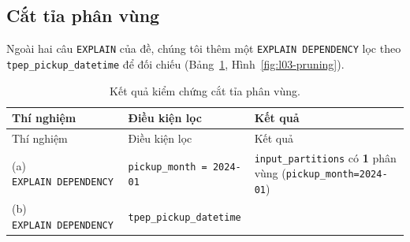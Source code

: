 \documentclass[
  12pt,
  a4paper,
]{report}
\begin{document}
\subsection{Cắt tỉa phân vùng}\label{sec:l03-res-pruning}

Ngoài hai câu \texttt{EXPLAIN} của đề, chúng tôi thêm một
\texttt{EXPLAIN\ DEPENDENCY}\allowbreak{} lọc theo
\texttt{tpep\_}\allowbreak{}\texttt{pickup\_}\allowbreak{}\texttt{datetime}\allowbreak{}
để đối chiếu (Bảng~\ref{tbl:l03-pruning}, Hình~\ref{fig:l03-pruning}).

\begin{longtable}[]{@{}
  >{\raggedright\arraybackslash}p{}
  >{\raggedright\arraybackslash}p{}
  >{\raggedright\arraybackslash}p{}@{}}
\caption{\label{tbl:l03-pruning}Kết quả kiểm chứng cắt tỉa phân
vùng.}\tabularnewline
\toprule\noalign{}
\begin{minipage}[b]{\linewidth}\raggedright
Thí nghiệm
\end{minipage} & \begin{minipage}[b]{\linewidth}\raggedright
Điều kiện lọc
\end{minipage} & \begin{minipage}[b]{\linewidth}\raggedright
Kết quả
\end{minipage} \\
\midrule\noalign{}
\endfirsthead
\toprule\noalign{}
\begin{minipage}[b]{\linewidth}\raggedright
Thí nghiệm
\end{minipage} & \begin{minipage}[b]{\linewidth}\raggedright
Điều kiện lọc
\end{minipage} & \begin{minipage}[b]{\linewidth}\raggedright
Kết quả
\end{minipage} \\
\midrule\noalign{}
\endhead
\bottomrule\noalign{}
\endlastfoot
(a) \texttt{EXPLAIN\ DEPENDENCY}\allowbreak{} &
\texttt{pickup\_}\allowbreak{}\texttt{month\ =}\allowbreak{}\texttt{\ \textquotesingle{}2024-01\textquotesingle{}}\allowbreak{}
& \texttt{input\_}\allowbreak{}\texttt{partitions}\allowbreak{} có
\textbf{1} phân vùng
(\texttt{pickup\_}\allowbreak{}\texttt{month=}\allowbreak{}\texttt{2024-01}\allowbreak{}) \\
(b) \texttt{EXPLAIN\ DEPENDENCY}\allowbreak{} &
\texttt{tpep\_}\allowbreak{}\texttt{pickup\_}\allowbreak{}\texttt{datetime}\allowbreak{}

\end{longtable}
\end{document}
